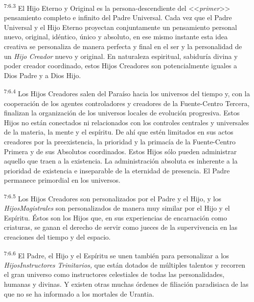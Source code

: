 \par
\textsuperscript{7:6.3} El Hijo Eterno y Original es la persona-descendiente del <<\textit{primer}>> pensamiento completo e infinito del Padre Universal. Cada vez que el Padre Universal y el Hijo Eterno proyectan conjuntamente un pensamiento personal nuevo, original, idéntico, único y absoluto, en ese mismo instante esta idea creativa se personaliza de manera perfecta y final en el ser y la personalidad de un \textit{Hijo Creador} nuevo y original. En naturaleza espiritual, sabiduría divina y poder creador coordinado, estos Hijos Creadores son potencialmente iguales a Dios Padre y a Dios Hijo.

\par
\textsuperscript{7:6.4} Los Hijos Creadores salen del Paraíso hacia los universos del tiempo y, con la cooperación de los agentes controladores y creadores de la Fuente-Centro Tercera, finalizan la organización de los universos locales de evolución progresiva. Estos Hijos no están conectados ni relacionados con los controles centrales y universales de la materia, la mente y el espíritu. De ahí que estén limitados en sus actos creadores por la preexistencia, la prioridad y la primacía de la Fuente-Centro Primera y de sus Absolutos coordinados. Estos Hijos sólo pueden administrar aquello que traen a la existencia. La administración absoluta es inherente a la prioridad de existencia e inseparable de la eternidad de presencia. El Padre permanece primordial en los universos.

\par
\textsuperscript{7:6.5} Los Hijos Creadores son personalizados por el Padre y el Hijo, y los \textit{HijosMagistrales} son personalizados de manera muy similar por el Hijo y el Espíritu.
Éstos son los Hijos que, en sus experiencias de encarnación como criaturas, se ganan el derecho de servir como jueces de la supervivencia en las creaciones del tiempo y del espacio.

\par
\textsuperscript{7:6.6} El Padre, el Hijo y el Espíritu se unen también para personalizar a los \textit{HijosInstructores Trinitarios,} que están dotados de múltiples talentos y recorren el gran universo como instructores celestiales de todas las personalidades, humanas y divinas. Y existen otras muchas órdenes de filiación paradisiaca de las que no se ha informado a los mortales de Urantia.

